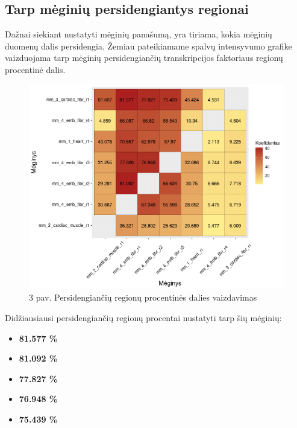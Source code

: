 \documentclass[12pt]{article}
\begin{document}
\newpage

\subsection{Tarp mėginių persidengiantys regionai}
Dažnai siekiant nustatyti mėginių panašumą, yra tiriama, kokia
mėginių duomenų dalis persidengia. Žemiau pateikiamame spalvų
intensyvumo grafike vaizduojama tarp mėginių persidengiančių
transkripcijos faktoriaus regionų procentinė dalis.

\begin{figure}[htb]
    \begin{center}
        \includegraphics[width=0.8\linewidth]{Figures/peak_overlaps_between_samples.png}
        \caption*{3 pav. Persidengiančių regionų procentinės dalies vaizdavimas}
    \end{center}
\end{figure}

Didžiausiausi persidengiančių regionų procentai nustatyti tarp
šių mėginių:
\begin{itemize}
    \item \textbf{81.577 \%}
    \item \textbf{81.092 \%}
    \item \textbf{77.827 \%}
    \item \textbf{76.948 \%}
    \item \textbf{75.439 \%}
  \end{itemize}

\newpage

\end{document}
